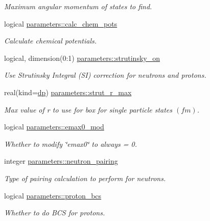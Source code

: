 \begin{DoxyCompactItemize}
\begin{DoxyCompactList}\small\item\em Maximum angular momentum of states to find. \end{DoxyCompactList}\item 
logical \mbox{\hyperlink{group__INPUT__PARS_ga6e579a9756d3f1c4d2ddc58a161b1f1a}{parameters\+::calc\+\_\+chem\+\_\+pots}}
\begin{DoxyCompactList}\small\item\em Calculate chemical potentials. \end{DoxyCompactList}\item 
logical, dimension(0\+:1) \mbox{\hyperlink{group__INPUT__PARS_gaad3b88a661482173813a2f76cba73b11}{parameters\+::strutinsky\+\_\+on}}
\begin{DoxyCompactList}\small\item\em Use Strutinsky Integral (SI) correction for neutrons and protons. \end{DoxyCompactList}\item 
real(kind=\mbox{\hyperlink{namespaceparameters_a52f8c6351fd79345d8811e065bcbbb37}{dp}}) \mbox{\hyperlink{group__INPUT__PARS_ga0dd8e62aa4b777681ce98d7c88cafdf8}{parameters\+::strut\+\_\+r\+\_\+max}}
\begin{DoxyCompactList}\small\item\em Max value of r to use for box for single particle states $(fm)$. \end{DoxyCompactList}\item 
logical \mbox{\hyperlink{group__INPUT__PARS_gacfc9efb68b340c8246340105af8678e0}{parameters\+::emax0\+\_\+mod}}
\begin{DoxyCompactList}\small\item\em Whether to modify \char`\"{}emax0\char`\"{} to always = 0. \end{DoxyCompactList}\item 
integer \mbox{\hyperlink{group__INPUT__PARS_gad6072a097df429aca7d4c3daf808ceda}{parameters\+::neutron\+\_\+pairing}}
\begin{DoxyCompactList}\small\item\em Type of pairing calculation to perform for neutrons. \end{DoxyCompactList}\item 
logical \mbox{\hyperlink{group__INPUT__PARS_ga7478728bc2b5fc83dee2f2c21724420c}{parameters\+::proton\+\_\+bcs}}
\begin{DoxyCompactList}\small\item\em Whether to do B\+CS for protons. \end{DoxyCompactList}\item 

\end{DoxyCompactItemize}
